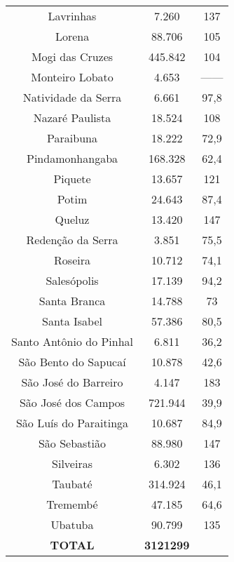 \begin{table}[htbp]
{\begin{tabular}{c|c|c}
    \rowcolor[rgb]{ .984,  .831,  .706} Lavrinhas & 7.260  & 137 \\
    \rowcolor[rgb]{ .992,  .914,  .851} Lorena & 88.706 & 105 \\
    \rowcolor[rgb]{ .984,  .831,  .706} Mogi das Cruzes & 445.842 & 104 \\
    \rowcolor[rgb]{ .992,  .914,  .851} Monteiro Lobato & 4.653  & ------ \\
    \rowcolor[rgb]{ .984,  .831,  .706} Natividade da Serra & 6.661  & 97,8 \\
    \rowcolor[rgb]{ .992,  .914,  .851} Nazaré Paulista & 18.524 & 108 \\
    \rowcolor[rgb]{ .984,  .831,  .706} Paraibuna & 18.222 & 72,9 \\
    \rowcolor[rgb]{ .992,  .914,  .851} Pindamonhangaba & 168.328 & 62,4 \\
    \rowcolor[rgb]{ .984,  .831,  .706} Piquete & 13.657 & 121 \\
    \rowcolor[rgb]{ .992,  .914,  .851} Potim & 24.643 & 87,4 \\
    \rowcolor[rgb]{ .984,  .831,  .706} Queluz & 13.420 & 147 \\
    \rowcolor[rgb]{ .992,  .914,  .851} Redenção da Serra & 3.851  & 75,5 \\
    \rowcolor[rgb]{ .984,  .831,  .706} Roseira & 10.712 & 74,1 \\
    \rowcolor[rgb]{ .992,  .914,  .851} Salesópolis & 17.139 & 94,2 \\
    \rowcolor[rgb]{ .984,  .831,  .706} Santa Branca & \multicolumn{1}{c}{14.788} & 73 \\
    \rowcolor[rgb]{ .992,  .914,  .851} Santa Isabel & 57.386 & 80,5 \\
    \rowcolor[rgb]{ .984,  .831,  .706} Santo Antônio do Pinhal & 6.811  & 36,2 \\
    \rowcolor[rgb]{ .992,  .914,  .851} São Bento do Sapucaí & 10.878 & 42,6 \\
    \rowcolor[rgb]{ .984,  .831,  .706} São José do Barreiro & 4.147  & 183 \\
    \rowcolor[rgb]{ .992,  .914,  .851} São José dos Campos & 721.944 & 39,9 \\
    \rowcolor[rgb]{ .984,  .831,  .706} São Luís do Paraitinga & 10.687 & 84,9 \\
    \rowcolor[rgb]{ .992,  .914,  .851} São Sebastião & 88.980 & 147 \\
    \rowcolor[rgb]{ .984,  .831,  .706} Silveiras & 6.302  & 136 \\
    \rowcolor[rgb]{ .992,  .914,  .851} Taubaté & 314.924 & 46,1 \\
    \rowcolor[rgb]{ .984,  .831,  .706} Tremembé & 47.185 & 64,6 \\
    \rowcolor[rgb]{ .992,  .914,  .851} Ubatuba & 90.799 & 135 \\
    \rowcolor[rgb]{ .984,  .831,  .706} \textbf{TOTAL} & \textbf{3121299} &  \\
    \end{tabular}%
}
  \label{tab:municipios_codivap}%
\end{table}%
